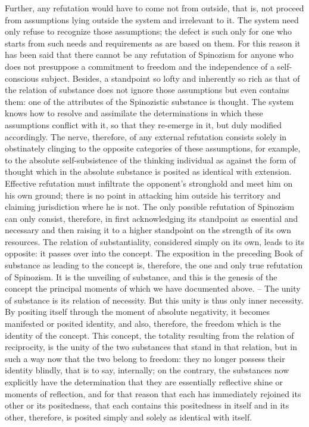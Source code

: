 Further, any refutation would have to come not from outside, that is, not
proceed from assumptions lying outside the system and irrelevant to it. The
system need only refuse to recognize those assumptions; the defect is such
only for one who starts from such needs and requirements as are based on
them. For this reason it has been said that there cannot be any refutation of
Spinozism for anyone who does not presuppose a commitment to freedom
and the independence of a self-conscious subject. Besides, a standpoint
so lofty and inherently so rich as that of the relation of substance does not
ignore those assumptions but even contains them: one of the attributes of
the Spinozistic substance is thought. The system knows how to resolve and
assimilate the determinations in which these assumptions conflict with it,
so that they re-emerge in it, but duly modified accordingly. The nerve,
therefore, of any external refutation consists solely in obstinately clinging
to the opposite categories of these assumptions, for example, to the absolute
self-subsistence of the thinking individual as against the form of thought
which in the absolute substance is posited as identical with extension.
Effective refutation must infiltrate the opponent's stronghold and meet
him on his own ground; there is no point in attacking him outside his
territory and claiming jurisdiction where he is not. The only possible
refutation of Spinozism can only consist, therefore, in first acknowledging
its standpoint as essential and necessary and then raising it to a higher
standpoint on the strength of its own resources. The relation of substantiality,
considered simply on its own, leads to its opposite: it passes over into the
concept. The exposition in the preceding Book of substance as leading to
the concept is, therefore, the one and only true refutation of Spinozism. It is
the unveiling of substance, and this is the genesis of the concept the principal
moments of which we have documented above. – The unity of substance is
its relation of necessity. But this unity is thus only inner necessity. By positing
itself through the moment of absolute negativity, it becomes manifested
or posited identity, and also, therefore, the freedom which is the identity
of the concept. This concept, the totality resulting from the relation of
reciprocity, is the unity of the two substances that stand in that relation,
but in such a way now that the two belong to freedom: they no longer
possess their identity blindly, that is to say, internally; on the contrary, the
substances now explicitly have the determination that they are essentially
reflective shine or moments of reflection, and for that reason that each has
immediately rejoined its other or its positedness, that each contains this
positedness in itself and in its other, therefore, is posited simply and solely
as identical with itself.

